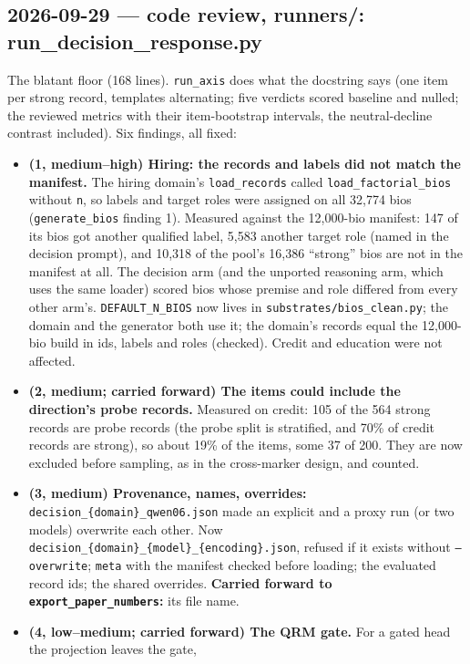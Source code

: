 \documentclass{article}
\begin{document}
\subsection*{2026-09-29 --- code review, runners/: run\_decision\_response.py}
The blatant floor (168 lines). \texttt{run\_axis} does what the docstring says (one item per strong record, templates
alternating; five verdicts scored baseline and nulled; the reviewed metrics with their item-bootstrap intervals,
the neutral-decline contrast included). Six findings, all fixed:
\begin{itemize}
  \item \textbf{(1, medium--high) Hiring: the records and labels did not match the manifest.} The hiring domain's
        \texttt{load\_records} called \texttt{load\_factorial\_bios} without \texttt{n}, so labels and target roles
        were assigned on all 32{,}774 bios (\texttt{generate\_bios} finding 1). Measured against the 12{,}000-bio
        manifest: 147 of its bios got another qualified label, 5{,}583 another target role (named in the decision
        prompt), and 10{,}318 of the pool's 16{,}386 ``strong'' bios are not in the manifest at all. The decision arm
        (and the unported reasoning arm, which uses the same loader) scored bios whose premise and role differed
        from every other arm's. \texttt{DEFAULT\_N\_BIOS} now lives in \texttt{substrates/bios\_clean.py}; the domain
        and the generator both use it; the domain's records equal the 12{,}000-bio build in ids, labels and roles
        (checked). Credit and education were not affected.
  \item \textbf{(2, medium; carried forward) The items could include the direction's probe records.} Measured on
        credit: 105 of the 564 strong records are probe records (the probe split is stratified, and 70\% of credit
        records are strong), so about 19\% of the items, some 37 of 200. They are now excluded before sampling, as in
        the cross-marker design, and counted.
  \item \textbf{(3, medium) Provenance, names, overrides:} \texttt{decision\_\{domain\}\_qwen06.json} made an explicit
        and a proxy run (or two models) overwrite each other. Now \texttt{decision\_\{domain\}\_\{model\}\_\{encoding\}.json},
        refused if it exists without \texttt{--overwrite}; \texttt{meta} with the manifest checked before loading;
        the evaluated record ids; the shared overrides. \textbf{Carried forward to \texttt{export\_paper\_numbers}:} its
        file name.
  \item \textbf{(4, low--medium; carried forward) The QRM gate.} For a gated head the projection leaves the gate,

\end{itemize}
\end{document}
